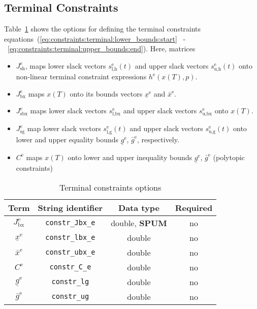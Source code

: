 \documentclass[
a4paper, %
10pt, %
notitlepage,
english]{CSUniSchoolLabReport}
\newcommand{\code}[1]{\texttt{#1}}
\newcommand{\ind}[1]{_{\textrm{#1}}}
\newcommand{\terminal}{^{\textrm{e}}}
\newcommand{\optional}{no}
\begin{document}
\begin{appendices}
\subsection{Terminal Constraints}\label{sec:constraints:terminal}
%
Table~\ref{tab:constraints:terminal} shows the options for defining the terminal constraints equations~(\ref{eq:constraints:terminal:lower_bounds:start} ~-~\ref{eq:constraints:terminal:upper_bounds:end}).
Here, matrices
\begin{itemize}
	\item $J\ind{sh}\terminal$, maps lower slack vectors $s\ind{l,h}\terminal(t)$ and upper slack vectors $s\ind{u,h}\terminal(t)$ onto non-linear terminal constraint expressions $h\terminal(x(T), p)$.
	\item $J\ind{bx}\terminal$ maps $x(T)$ onto its bounds vectors $\underline{x}\terminal$ and $\bar{x}\terminal$.
	\item $J\ind{sbx}\terminal$ maps lower slack vectors $s\ind{l,bx}\terminal$ and upper slack vectors $s\ind{u,bx}\terminal$ onto $x(T)$.
	\item $J\ind{sg}\terminal$ map lower slack vectors $s\ind{l,g}\terminal(t)$ and upper slack vectors $s\ind{u,g}\terminal(t)$ onto lower and upper equality bounds $\underline{g}\terminal$, $\bar{g}\terminal$, respectively.
	\item $C\terminal$ maps $x(T)$ onto lower and upper inequality bounds $\underline{g}\terminal$, $\bar{g}\terminal$ (polytopic constraints)
\end{itemize}
%
\begin{table}[h!]
	\centering
	\caption{Terminal constraints options} \label{tab:constraints:terminal}
	\begin{tabular}{cccc}
		\toprule
		Term & String identifier & Data type & Required \\ \midrule
		$J\ind{bx}\terminal$ & \code{constr\_Jbx\_e}    & double, \textbf{SPUM}   & \optional   \\
		$\underline{x}\terminal $    & \code{constr\_lbx\_e}     & double  & \optional   \\
		$\bar{x}\terminal $         & \code{constr\_ubx\_e}     & double   & \optional  \\ [1em]
		$ C\terminal $ & \code{constr\_C\_e}    & double   & \optional   \\
		$\underline{g}\terminal $    & \code{constr\_lg}     & double   & \optional   \\
		$\bar{g}\terminal $         & \code{constr\_ug}     & double   & \optional  \\ [1em]

\end{tabular}
\end{table}
\end{appendices}
\end{document}
